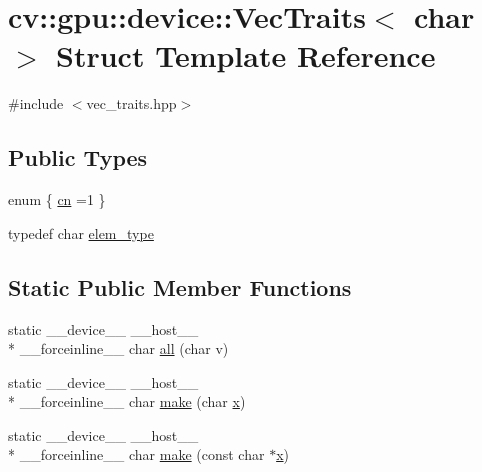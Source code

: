 \hypertarget{structcv_1_1gpu_1_1device_1_1VecTraits_3_01char_01_4}{\section{cv\-:\-:gpu\-:\-:device\-:\-:Vec\-Traits$<$ char $>$ Struct Template Reference}
\label{structcv_1_1gpu_1_1device_1_1VecTraits_3_01char_01_4}
}


{\ttfamily \#include $<$vec\-\_\-traits.\-hpp$>$}

\subsection*{Public Types}
\begin{DoxyCompactItemize}
\item 
enum \{ \hyperlink{structcv_1_1gpu_1_1device_1_1VecTraits_3_01char_01_4_aeb356ffe14fad0be200363ee6ea20262aeb59ca53978f0d005ae3909b5b4f0ad8}{cn} =1
 \}
\item 
typedef char \hyperlink{structcv_1_1gpu_1_1device_1_1VecTraits_3_01char_01_4_a001146e7c1cdebf4d140ef7a279491b4}{elem\-\_\-type}
\end{DoxyCompactItemize}
\subsection*{Static Public Member Functions}
\begin{DoxyCompactItemize}
\item 
static \-\_\-\-\_\-device\-\_\-\-\_\- \-\_\-\-\_\-host\-\_\-\-\_\- \\*
\-\_\-\-\_\-forceinline\-\_\-\-\_\- char \hyperlink{structcv_1_1gpu_1_1device_1_1VecTraits_3_01char_01_4_a19b564925baa271f8cc9548d4b231951}{all} (char v)
\item 
static \-\_\-\-\_\-device\-\_\-\-\_\- \-\_\-\-\_\-host\-\_\-\-\_\- \\*
\-\_\-\-\_\-forceinline\-\_\-\-\_\- char \hyperlink{structcv_1_1gpu_1_1device_1_1VecTraits_3_01char_01_4_aa87ff4eda9cefbd7b77eadee4fd8dae3}{make} (char \hyperlink{highgui__c_8h_a6150e0515f7202e2fb518f7206ed97dc}{x})
\item 
static \-\_\-\-\_\-device\-\_\-\-\_\- \-\_\-\-\_\-host\-\_\-\-\_\- \\*
\-\_\-\-\_\-forceinline\-\_\-\-\_\- char \hyperlink{structcv_1_1gpu_1_1device_1_1VecTraits_3_01char_01_4_aced8001be188052305ced245a17b753d}{make} (const char $\ast$\hyperlink{highgui__c_8h_a6150e0515f7202e2fb518f7206ed97dc}{x})
\end{DoxyCompactItemize}


